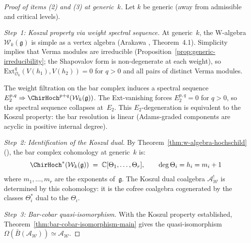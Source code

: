 \begin{proof}[Proof of items \textup{(2)} and \textup{(3)} at generic~$k$]
Let $k$ be generic (away from admissible and critical levels).

\emph{Step~1: Koszul property via weight spectral sequence.}
At generic~$k$, the W-algebra $\mathcal{W}_k(\mathfrak{g})$ is simple
as a vertex algebra (Arakawa \cite{Ara07}, Theorem~4.1).  Simplicity
implies that Verma modules are irreducible
(Proposition~\ref{prop:generic-irreducibility}; the Shapovalov form
is non-degenerate at each weight), so
$\mathrm{Ext}^q_{\mathcal{O}_k}(V(h_1), V(h_2)) = 0$ for $q > 0$
and all pairs of distinct Verma modules.

The weight filtration on the bar complex induces a spectral sequence
$E_2^{p,q} \Rightarrow \ChirHoch^{p+q}(\mathcal{W}_k(\mathfrak{g}))$.
The Ext-vanishing forces $E_2^{p,q} = 0$ for $q > 0$, so the spectral
sequence collapses at~$E_2$.  This $E_2$-degeneration is equivalent to
the Koszul property: the bar resolution is linear
(Adams-graded components are acyclic in positive internal degree).

\emph{Step~2: Identification of the Koszul dual.}
By Theorem~\ref{thm:w-algebra-hochschild} (\ClaimStatusProvedHere),
the bar complex cohomology at generic~$k$ is:
\[
\ChirHoch^*(\mathcal{W}_k(\mathfrak{g}))
\;=\; \mathbb{C}[\Theta_1, \ldots, \Theta_r],
\qquad \deg \Theta_i = h_i = m_i + 1
\]
where $m_1, \ldots, m_r$ are the exponents of~$\mathfrak{g}$.
The Koszul dual coalgebra $\mathcal{A}_{\mathcal{W}}^!$ is determined by
this cohomology: it is the cofree coalgebra cogenerated by the classes
$\Theta_i^*$ dual to the $\Theta_i$.

\emph{Step~3: Bar-cobar quasi-isomorphism.}
With the Koszul property established,
Theorem~\ref{thm:bar-cobar-isomorphism-main} gives the
quasi-isomorphism
$\Omega(\bar{B}(\mathcal{A}_{\mathcal{W}})) \simeq
\mathcal{A}_{\mathcal{W}}$.
\end{proof}


